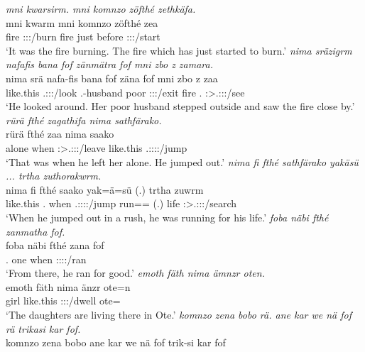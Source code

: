 \begin{exe}
\newpage 	
{}
	\emph{mni kwarsirm. mni komnzo zöfthé zethkäfa.}\\
	\gll mni kwarm mni komnzo zöfthé zea\\
	fire \Sg:\Sbj:\Pst:\Dur/burn fire just before \Sg:\Sbj:\Pst:\Pfv/start\\
	\trans `It was the fire burning. The fire which has just started to burn.'
	\emph{nima sräzigrm nafafis bana fof zänmätra fof mni zbo z zamara.}\\
	\gll nima srä nafa-fis bana fof zäna fof mni zbo z zaa\\
	{like.this} \Tsg.\Masc:\Sbj:\Irr:\Pfv/look \Third.\Poss-husband poor {\Emph} \Sg:\Sbj:\Pst:\Pfv/exit {\Emph} fire \Prox.{\All} {\Iam} \Sg:\Sbj>\Tsg.\F:\Obj:\Pst:\Pfv/see\\
	\trans `He looked around. Her poor husband stepped outside and saw the fire close by.' 	
	\emph{rürä fthé zagathifa nima sathfärako.}\\
	\gll rürä fthé zaa nima saako\\
	alone when \Sg:\Sbj>\Tsg.\F:\Obj:\Pst:\Pfv/leave {like.this} \Tsg.\Masc:\Sbj:\Pst:\Pfv:\Andat/jump\\
	\trans `That was when he left her alone. He jumped out.'
	\emph{nima fi fthé sathfärako yakäsü ... trtha zuthorakwrm.}\\
	\gll nima fi fthé saako yak=ä=sü (.) trtha zuwrm\\
	{like.this} \Third.{\Abs} when \Tsg.\Masc:\Sbj:\Pst:\Pfv:\Andat/jump run=\Assoc=\Etc{} (.) life \Sg:\Sbj>\Tsg.\F:\Obj:\Pst:\Dur/search\\
	\trans `When he jumped out in a rush, he was running for his life.'
	\emph{foba näbi fthé zanmatha fof.}\\
	\gll foba näbi fthé zana fof\\
	\Dist.{\Abl} one when \Sg:\Sbj:\Pst:\Pfv:\Venit/ran \Emph\\
	\trans `From there, he ran for good.'
	\emph{emoth fäth nima ämnzr oten.}\\
	\gll emoth fäth nima änzr ote=n\\
	girl \Dim{} {like.this} \Stpl:\Sbj:\Nonpast:\Ipfv/dwell ote={\Loc}\\
	\trans `The daughters are living there in Ote.'
	\emph{komnzo zena bobo rä. ane kar we nä fof rä trikasi kar fof.}\\
	\gll komnzo zena bobo  ane kar we nä fof  trik-si kar fof\\

\end{exe}
